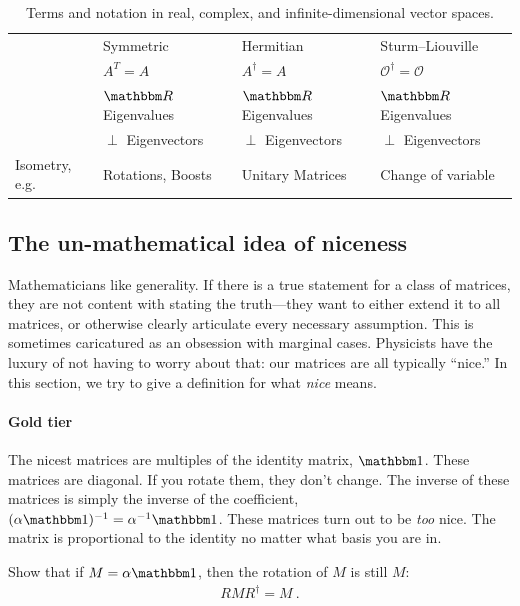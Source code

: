 \documentclass[12pt]{article}
\begin{document}
\begin{table}
\begin{tabular}{ @{} llll @{} }
            & Symmetric
            & Hermitian
            & Sturm--Liouville
        \\
            & $A^T = A$
            & $A^\dag = A$
            & $\mathcal O^\dag = \mathcal O$
        \\
            & $\RR$ Eigenvalues
            & $\RR$ Eigenvalues
            & $\RR$ Eigenvalues
        \\
            & $\perp$ Eigenvectors
            & $\perp$ Eigenvectors
            & $\perp$ Eigenvectors
        \\
        Isometry, e.g.
            & Rotations, Boosts
            & Unitary Matrices
            & Change of variable
        \\ \bottomrule
    \end{tabular}
    \caption{
        Terms and notation in real, complex, and infinite-dimensional vector spaces. 
        \label{table:vectors:numbers}
  }
\end{table}

\subsection{The un-mathematical idea of niceness}
\label{sec:nice}

Mathematicians like generality. If there is a true statement for a class of matrices, they are not content with stating the truth---they want to either extend it to all matrices, or otherwise clearly articulate every necessary assumption. This is sometimes caricatured as an obsession with marginal cases. Physicists have the luxury of not having to worry about that: our matrices are all typically ``nice.'' In this section, we try to give a definition for what \emph{nice} means. 

\paragraph{Gold tier} The nicest matrices are multiples of the identity matrix, $\one$. These matrices are diagonal. If you rotate them, they don't change. The inverse of these matrices is simply the inverse of the coefficient, $(\alpha \one)^{-1} = \alpha^{-1} \one$. These matrices turn out to be \emph{too} nice. The matrix is proportional to the identity no matter what basis you are in.

\begin{exercise}
Show that if $M = \alpha \one$, then the rotation of $M$ is still $M$:
\begin{align}
    RMR^\dag = M \ .
\end{align}
\end{exercise}
\end{document}
